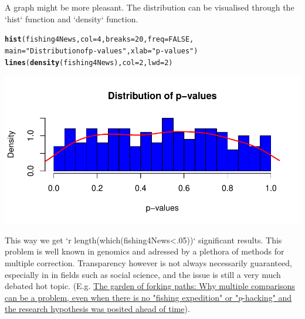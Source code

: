 \documentclass{article}\usepackage[]{graphicx}\usepackage[]{color}
\makeatletter
\def\maxwidth{ %
  \ifdim\Gin@nat@width>\linewidth
    \linewidth
  \else
    \Gin@nat@width
  \fi
}
\newcommand{\hlnum}[1]{\textcolor[rgb]{0.686,0.059,0.569}{#1}}%
\newcommand{\hlstr}[1]{\textcolor[rgb]{0.192,0.494,0.8}{#1}}%
\newcommand{\hlstd}[1]{\textcolor[rgb]{0.345,0.345,0.345}{#1}}%
\newcommand{\hlkwc}[1]{\textcolor[rgb]{0.333,0.667,0.333}{#1}}%
\newcommand{\hlkwd}[1]{\textcolor[rgb]{0.737,0.353,0.396}{\textbf{#1}}}%
\newenvironment{kframe}{%
 \def\at@end@of@kframe{}%
 \ifinner\ifhmode%
  \def\at@end@of@kframe{\end{minipage}}%
  \begin{minipage}{\columnwidth}%
 \fi\fi%
 \def\FrameCommand##1{\hskip\@totalleftmargin \hskip-\fboxsep
 \colorbox{shadecolor}{##1}\hskip-\fboxsep
     \hskip-\linewidth \hskip-\@totalleftmargin \hskip\columnwidth}%
 \MakeFramed {\advance\hsize-\width
   \@totalleftmargin\z@ \linewidth\hsize
   \@setminipage}}%
 {\par\unskip\endMakeFramed%
 \at@end@of@kframe}
\newenvironment{knitrout}{}{} %
\makeatother
\begin{document}
A graph might be more pleasant. The distribution can be visualised through the `hist` function and `density` function.
\begin{knitrout}
\color{fgcolor}\begin{kframe}
\begin{alltt}
\hlkwd{hist}\hlstd{(fishing4News,} \hlkwc{col}\hlstd{=}\hlnum{4}\hlstd{,} \hlkwc{breaks}\hlstd{=}\hlnum{20}\hlstd{,} \hlkwc{freq}\hlstd{=}\hlnum{FALSE}\hlstd{,}
     \hlkwc{main}\hlstd{=}\hlstr{"Distribution of p-values"}\hlstd{,} \hlkwc{xlab}\hlstd{=}\hlstr{"p-values"}\hlstd{)}
\hlkwd{lines}\hlstd{(}\hlkwd{density}\hlstd{(fishing4News),} \hlkwc{col}\hlstd{=}\hlnum{2}\hlstd{,} \hlkwc{lwd}\hlstd{=}\hlnum{2}\hlstd{)}
\end{alltt}
\end{kframe}
\includegraphics[width=\maxwidth]{figure/rFigFishing} 

\end{knitrout}


This way we get `r length(which(fishing4News<.05))` significant results. This problem is well known in genomics and adressed by a plethora of methods for multiple correction. Transparency however is not always necessarily guaranteed, especially in in fields such as social science, and the issue is still a very much debated hot topic. (E.g. \href{http://www.stat.columbia.edu/~gelman/research/unpublished/p_hacking.pdf}{The garden of forking paths: Why multiple comparisons can be a problem,
even when there is no "fishing expedition" or "$p$-hacking" and the research
hypothesis was posited ahead of time}). 
\end{document}
